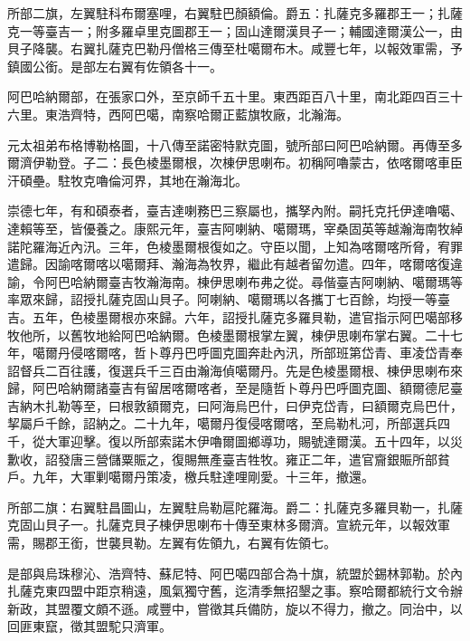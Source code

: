 \begin{pinyinscope}
所部二旗，左翼駐科布爾塞哩，右翼駐巴顏額倫。爵五：扎薩克多羅郡王一；扎薩克一等臺吉一；附多羅卓里克圖郡王一；固山達爾漢貝子一；輔國達爾漢公一，由貝子降襲。右翼扎薩克巴勒丹僧格三傳至杜噶爾布木。咸豐七年，以報效軍需，予鎮國公銜。是部左右翼有佐領各十一。

阿巴哈納爾部，在張家口外，至京師千五十里。東西距百八十里，南北距四百三十六里。東浩齊特，西阿巴噶，南察哈爾正藍旗牧廠，北瀚海。

元太祖弟布格博勒格圖，十八傳至諾密特默克圖，號所部曰阿巴哈納爾。再傳至多爾濟伊勒登。子二：長色棱墨爾根，次棟伊思喇布。初稱阿嚕蒙古，依喀爾喀車臣汗碩壘。駐牧克嚕倫河界，其地在瀚海北。

崇德七年，有和碩泰者，臺吉達喇務巴三察屬也，攜孥內附。嗣托克托伊達嚕噶、達賴等至，皆優養之。康熙元年，臺吉阿喇納、噶爾瑪，宰桑固英等越瀚海南牧綽諾陀羅海近內汛。三年，色棱墨爾根復如之。守臣以聞，上知為喀爾喀所脅，宥罪遣歸。因諭喀爾喀以噶爾拜、瀚海為牧界，繼此有越者留勿遣。四年，喀爾喀復違諭，令阿巴哈納爾臺吉牧瀚海南。棟伊思喇布弗之從。尋偕臺吉阿喇納、噶爾瑪等率眾來歸，詔授扎薩克固山貝子。阿喇納、噶爾瑪以各攜丁七百餘，均授一等臺吉。五年，色棱墨爾根亦來歸。六年，詔授扎薩克多羅貝勒，遣官指示阿巴噶部移牧他所，以舊牧地給阿巴哈納爾。色棱墨爾根掌左翼，棟伊思喇布掌右翼。二十七年，噶爾丹侵喀爾喀，哲卜尊丹巴呼圖克圖奔赴內汛，所部班第岱青、車凌岱青奉詔督兵二百往護，復選兵千三百由瀚海偵噶爾丹。先是色棱墨爾根、棟伊思喇布來歸，阿巴哈納爾諸臺吉有留居喀爾喀者，至是隨哲卜尊丹巴呼圖克圖、額爾德尼臺吉納木扎勒等至，曰根敦額爾克，曰阿海烏巴什，曰伊克岱青，曰額爾克烏巴什，挈屬戶千餘，詔納之。二十九年，噶爾丹復侵喀爾喀，至烏勒札河，所部選兵四千，從大軍迎擊。復以所部索諾木伊嚕爾圖鄉導功，賜號達爾漢。五十四年，以災歉收，詔發唐三營儲粟賑之，復賜無產臺吉牲牧。雍正二年，遣官齎銀賑所部貧戶。九年，大軍剿噶爾丹策凌，檄兵駐達哩剛愛。十三年，撤還。

所部二旗：右翼駐昌圖山，左翼駐烏勒扈陀羅海。爵二：扎薩克多羅貝勒一，扎薩克固山貝子一。扎薩克貝子棟伊思喇布十傳至東林多爾濟。宣統元年，以報效軍需，賜郡王銜，世襲貝勒。左翼有佐領九，右翼有佐領七。

是部與烏珠穆沁、浩齊特、蘇尼特、阿巴噶四部合為十旗，統盟於錫林郭勒。於內扎薩克東四盟中距京稍遠，風氣獨守舊，迄清季無招墾之事。察哈爾都統行文令辦新政，其盟覆文頗不遜。咸豐中，嘗徵其兵備防，旋以不得力，撤之。同治中，以回匪東竄，徵其盟駝只濟軍。


\end{pinyinscope}